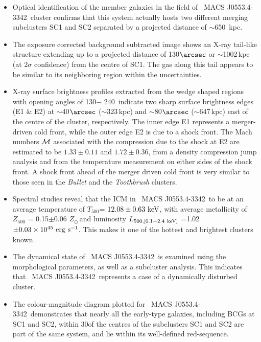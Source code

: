 \documentclass[useASM,usenatbib]{mn2e}
\newcommand\kev{{\rm~keV}}
\newcommand{\mac}{\rm~MACS J0553.4-3342}
\begin{document}
\begin{itemize}

\item Optical identification of the member galaxies in the field of
  \mac\ cluster confirms that this system actually hosts two different
  merging subclusters SC1 and SC2 separated by a projected distance of
  $\sim$650~kpc. 
  
\item The exposure corrected background subtracted image shows an
  X-ray tail-like structure extending up to a projected distance of
  130$\arcsec$ or $\sim$1002\,kpc (at 2$\sigma$ confidence) from the
  centre of SC1. The gas along this tail appears to be similar to its neighboring region within the uncertainties.

\item X-ray surface brightness profiles extracted from
  the wedge shaped regions with opening angles of 130\degr $-$
  240\degr~indicate two sharp surface brightness edges (E1 \& E2) at
  $\sim$40$\arcsec$ ($\sim$323\,kpc) and $\sim$80$\arcsec$
  ($\sim$647\,kpc) east of the centre of the cluster,
  respectively. The inner edge E1 represents a merger-driven cold front,
  while the outer edge E2 is due to a shock front. The Mach numbers
  ${\cal M}$ associated with the compression due to the shock at E2 are
  estimated to be $1.33\pm0.11$ and $1.72\pm0.36$, from a density
  compression jump analysis and from the temperature measurement on either
  sides of the shock front. A shock front ahead of the
  merger driven cold front is very similar to those seen in the
  \textit{Bullet} and the \textit{Toothbrush} clusters.

\item Spectral studies reveal that the ICM in \mac\ to be at an average
  temperature of $T_{500}$= $12.08\pm0.63\kev$, with average metallicity
  of $Z_{500}$ = 0.15$\pm 0.06$ $Z_{\odot}$\,and luminosity
  $L_{500,[0.1-2.4\kev]}$ =1.02$\pm0.03\times10^{45} {~\rm
    erg~s^{-1}}$. This makes it one of the hottest and
  brightest clusters known. 

\item The dynamical state of \mac\ is examined using the morphological
  parameters, as well as a subcluster analysis. This indicates
  that \mac\ represents a case of a dynamically disturbed
  cluster.

\item The colour-magnitude diagram plotted for \mac\ demonstrates that
  nearly all the early-type galaxies, including BCGs at SC1 and SC2,
  within 30\arcsec of the centres of the subclusters SC1 and SC2 are part of the
  same system, and lie within its well-defined red-sequence.


\end{itemize}
\end{document}
